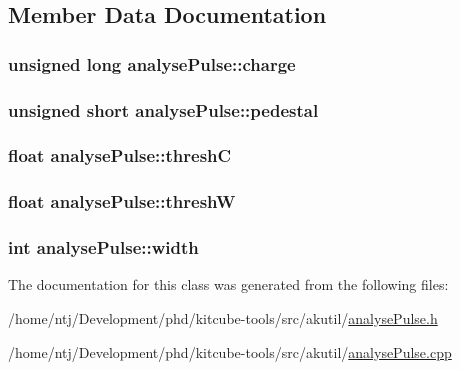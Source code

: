 \subsection{Member Data Documentation}
\hypertarget{classanalysePulse_a627c195d98e2a9df7329eceddb1f9b8a}{
\subsubsection[{charge}]{\setlength{\rightskip}{0pt plus 5cm}unsigned long analyse\-Pulse\-::charge}}\label{classanalysePulse_a627c195d98e2a9df7329eceddb1f9b8a}
\hypertarget{classanalysePulse_a9f10e08873da12460e9df17c2052bb7f}{
\subsubsection[{pedestal}]{\setlength{\rightskip}{0pt plus 5cm}unsigned short analyse\-Pulse\-::pedestal}}\label{classanalysePulse_a9f10e08873da12460e9df17c2052bb7f}
\hypertarget{classanalysePulse_a13a79360ba44937070cdabeeed8d9a30}{
\subsubsection[{thresh\-C}]{\setlength{\rightskip}{0pt plus 5cm}float analyse\-Pulse\-::thresh\-C}}\label{classanalysePulse_a13a79360ba44937070cdabeeed8d9a30}
\hypertarget{classanalysePulse_a6770c0e1c7f266f52f9ca2bb9f60e78f}{
\subsubsection[{thresh\-W}]{\setlength{\rightskip}{0pt plus 5cm}float analyse\-Pulse\-::thresh\-W}}\label{classanalysePulse_a6770c0e1c7f266f52f9ca2bb9f60e78f}
\hypertarget{classanalysePulse_a221394fcd9acca79d2239e0303f5fddb}{
\subsubsection[{width}]{\setlength{\rightskip}{0pt plus 5cm}int analyse\-Pulse\-::width}}\label{classanalysePulse_a221394fcd9acca79d2239e0303f5fddb}


The documentation for this class was generated from the following files\-:\begin{DoxyCompactItemize}
\item 
/home/ntj/\-Development/phd/kitcube-\/tools/src/akutil/\hyperlink{analysePulse_8h}{analyse\-Pulse.\-h}\item 
/home/ntj/\-Development/phd/kitcube-\/tools/src/akutil/\hyperlink{analysePulse_8cpp}{analyse\-Pulse.\-cpp}\end{DoxyCompactItemize}
